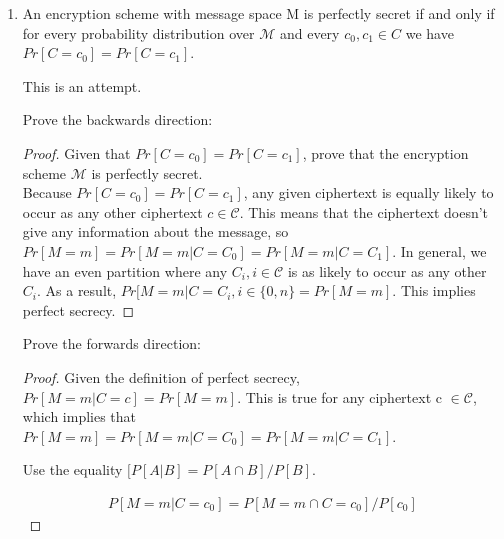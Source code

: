 \documentclass{article}
\begin{document}
\begin{enumerate}
\begin{enumerate}
\begin{proof}
        $Pr[M = m | C = c) = P(M = m]$\newline

        This implies that $Pr[M = m_0 | C = c] = Pr[M = m_0]$ and $Pr[M = m_1 | C = c] = Pr[M = m_1]$. We then find that $Pr[M = m_0 \mid C = c] =
          Pr[M = m_0] \neq Pr[M = m_1] = Pr[M = m_1 \mid C = c]$ by the current probability distribution. This contradicts the initial assumption that $Pr[M = m_1 | C = c] = Pr[M = m_1 \mid C = c]$
        
        \end{proof}

      \item An encryption scheme with message space M is perfectly secret if and 
        only if for every probability distribution over $\mathcal{M}$ and every
        $c_0, c_1 \in C$ 
        we have $Pr\left[C = c_0\right] = Pr\left[C = c_1\right]$.

        This is an attempt.

        Prove the backwards direction:

        \begin{proof}
        Given that $Pr\left[C = c_0\right] = Pr\left[C = c_1\right]$, prove that the encryption scheme $\mathcal{M}$ is perfectly secret.\\

        Because $Pr\left[C = c_0\right] = Pr\left[C = c_1\right]$, any given ciphertext is equally likely to occur as any other ciphertext $c \in \mathcal{C}$. This means that the ciphertext doesn't give any information about the message, so $Pr[M = m] = Pr[M = m | C = C_0] = Pr[M = m | C = C_1]$. In general, we have an even partition where any $C_i, i \in \mathcal{C}$ is as likely to occur as any other $C_i$. As a result, $Pr[M = m | C = C_i, i \in \{0, n\} = Pr[M = m]$. This implies perfect secrecy.
        \end{proof}

        Prove the forwards direction:

        \begin{proof}
        Given the definition of perfect secrecy,  $Pr[M = m | C = c] = Pr[M = m]$. This is true for any ciphertext c $\in \mathcal{C}$, which implies that $Pr[M = m] = Pr[M = m | C = C_0] = Pr[M = m | C = C_1]$.

        Use the equality $[P[A | B] = P[A \cap B] / P[B]$. 

        \begin{align*}
            P[M = m | C = c_0] = P[M = m \cap C = c_0] / P[c_0]
        \end{align*}


\end{proof}
\end{enumerate}
\end{enumerate}
\end{document}
